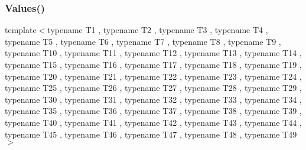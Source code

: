 \mbox{\label{namespacetesting_a034785cd0f04e5f5ec9e16c1cad5ccde}} 
\subsubsection{\texorpdfstring{Values()}{Values()}\hspace{0.1cm}{\footnotesize\ttfamily [49/50]}}
{\footnotesize\ttfamily template$<$typename T1 , typename T2 , typename T3 , typename T4 , typename T5 , typename T6 , typename T7 , typename T8 , typename T9 , typename T10 , typename T11 , typename T12 , typename T13 , typename T14 , typename T15 , typename T16 , typename T17 , typename T18 , typename T19 , typename T20 , typename T21 , typename T22 , typename T23 , typename T24 , typename T25 , typename T26 , typename T27 , typename T28 , typename T29 , typename T30 , typename T31 , typename T32 , typename T33 , typename T34 , typename T35 , typename T36 , typename T37 , typename T38 , typename T39 , typename T40 , typename T41 , typename T42 , typename T43 , typename T44 , typename T45 , typename T46 , typename T47 , typename T48 , typename T49 $>$ \\
}
